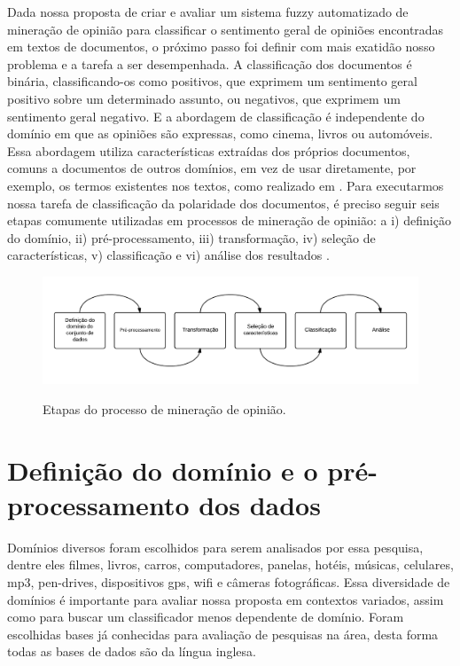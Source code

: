 Dada nossa proposta de criar e avaliar um sistema fuzzy automatizado de mineração de opinião para classificar o sentimento geral de opiniões encontradas em textos de documentos, o próximo passo foi definir com mais exatidão nosso problema e a tarefa a ser desempenhada. A classificação dos documentos é binária, classificando-os como positivos, que exprimem um sentimento geral positivo sobre um determinado assunto, ou negativos, que exprimem um sentimento geral negativo. E a abordagem de classificação é independente do domínio em que as opiniões são expressas, como cinema, livros ou automóveis. Essa abordagem utiliza características extraídas dos próprios documentos, comuns a documentos de outros domínios, em vez de usar diretamente, por exemplo, os termos existentes nos textos, como realizado em \cite{pang2002thumbs, pang2004sentimental, pang:2008}. Para executarmos nossa tarefa de classificação da polaridade dos documentos, é preciso seguir seis etapas comumente utilizadas em processos de mineração de opinião: a i) definição do domínio, ii) pré-processamento, iii) transformação, iv) seleção de características, v) classificação e vi) análise dos resultados \cite{moraes2012document}. 


\begin{figure}[h]
\caption{Etapas do processo de mineração de opinião.}
\centering
\includegraphics[scale=0.35]{opinion_mining_process.png}
\label{figura:processo_mineracao}
\end{figure}


\section{Definição do domínio e o pré-processamento dos dados}

 Domínios diversos foram escolhidos para serem analisados por essa pesquisa, dentre eles filmes, livros, carros, computadores, panelas, hotéis, músicas, celulares, mp3, pen-drives, dispositivos gps, wifi e câmeras fotográficas. Essa diversidade de domínios é importante para avaliar nossa proposta em contextos variados, assim como para buscar um classificador menos dependente de domínio. Foram escolhidas bases já conhecidas para avaliação de pesquisas na área, desta forma todas as bases de dados são da língua inglesa.

